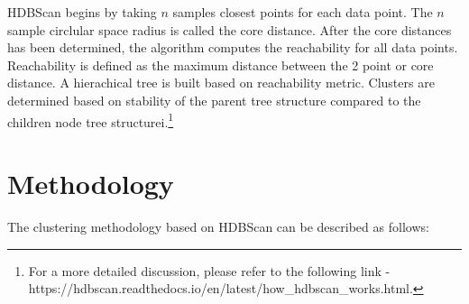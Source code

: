 \documentclass{article}
\begin{document}
HDBScan begins by taking $n$ samples closest points for each data point. The $n$ sample circlular space radius is called the core distance. After the core distances has been determined, the algorithm computes the reachability for all data points. Reachability is defined as the maximum distance between the 2 point or core distance. A hierachical tree is built based on reachability metric. Clusters are determined based on stability of the parent tree structure compared to the children node tree structurei.\footnote{For a more detailed discussion, please refer to the following link -  https://hdbscan.readthedocs.io/en/latest/how\_hdbscan\_works.html.}

\section{Methodology}
The clustering methodology based on HDBScan can be described as follows:
\end{document}
